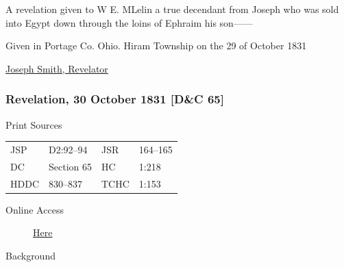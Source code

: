 {				A revelation given to W E. MLelin a true decendant from Joseph who was sold into Egypt down through the loins of Ephraim his son------
				
				Given in Portage Co. Ohio. Hiram Township on the 29 of October 1831
				
				\begin{tightright}
					\uline{Joseph Smith, Revelator}
				\end{tightright}
				
		\subsubsection{Revelation, 30 October 1831 [D\&C 65]}
			\label{EMS-1831-JS-30-OCT-1831}
		
			\begin{description}
				\item[Print Sources]
			\end{description}

				\begin{tabular}{p{0.5in}p{1in}p{0.5in}p{1in}}
				JSP	 	& D2:92--94		& JSR 		& 164--165 \\
				DC	 	& Section 65 	& HC 		& 1:218 \\
				HDDC 	& 830--837		& TCHC 		& 1:153 \\
				\end{tabular}
			
			\begin{description}
				\item[Online Access] \href{https://www.josephsmithpapers.org/paper-summary/revelation-30-october-1831-dc-65/1}{Here}
			\end{description}
			
			\begin{description}
				\item[Background]
			\end{description}
			
			
}
